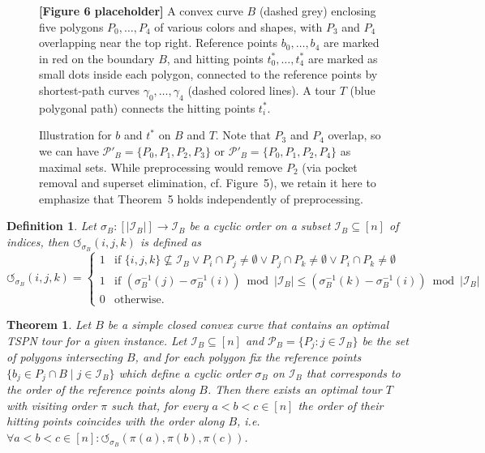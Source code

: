 \documentclass[11pt,a4paper]{article}
\theoremstyle{plain}
\newtheorem{theorem}{Theorem}
\newtheorem{definition}{Definition}
\begin{document}
\begin{figure}[h]
\centering
\begin{figplaceholder}
\textbf{[Figure 6 placeholder]} A convex curve $B$ (dashed grey) enclosing five polygons $P_0,\dots,P_4$ of various colors and shapes, with $P_3$ and $P_4$ overlapping near the top right. Reference points $b_0,\dots,b_4$ are marked in red on the boundary $B$, and hitting points $t_0^*,\dots,t_4^*$ are marked as small dots inside each polygon, connected to the reference points by shortest-path curves $\gamma_0,\dots,\gamma_4$ (dashed colored lines). A tour $T$ (blue polygonal path) connects the hitting points $t_i^*$.
\end{figplaceholder}
\caption{Illustration for $b$ and $t^*$ on $B$ and $T$. Note that $P_3$ and $P_4$ overlap, so we can have $\mathcal{P}'_B = \{P_0, P_1, P_2, P_3\}$ or $\mathcal{P}'_B = \{P_0, P_1, P_2, P_4\}$ as maximal sets. While preprocessing would remove $P_2$ (via pocket removal and superset elimination, cf. Figure~5), we retain it here to emphasize that Theorem~5 holds independently of preprocessing.}
\label{fig:6}
\end{figure}

\begin{definition}
Let $\sigma_B : [|\mathcal{I}_B|] \to \mathcal{I}_B$ be a cyclic order on a subset $\mathcal{I}_B \subseteq [n]$ of indices, then $\circlearrowleft_{\sigma_B}(i,j,k)$ is defined as
\[
\circlearrowleft_{\sigma_B}(i,j,k) =
\begin{cases}
1 & \text{if } \{i,j,k\} \not\subseteq \mathcal{I}_B \lor P_i \cap P_j \neq \emptyset \lor P_j \cap P_k \neq \emptyset \lor P_i \cap P_k \neq \emptyset \\
1 & \text{if } (\sigma_B^{-1}(j) - \sigma_B^{-1}(i)) \bmod |\mathcal{I}_B| \leq (\sigma_B^{-1}(k) - \sigma_B^{-1}(i)) \bmod |\mathcal{I}_B| \\
0 & \text{otherwise.}
\end{cases}
\]
\end{definition}

\begin{theorem}
Let $B$ be a simple closed convex curve that contains an optimal TSPN tour for a given instance. Let $\mathcal{I}_B \subseteq [n]$ and $\mathcal{P}_B = \{P_j : j \in \mathcal{I}_B\}$ be the set of polygons intersecting $B$, and for each polygon fix the reference points $\{b_j \in P_j \cap B \mid j \in \mathcal{I}_B\}$ which define a cyclic order $\sigma_B$ on $\mathcal{I}_B$ that corresponds to the order of the reference points along $B$. Then there exists an optimal tour $T$ with visiting order $\pi$ such that, for every $a < b < c \in [n]$ the order of their hitting points coincides with the order along $B$, i.e. $\forall a < b < c \in [n] : \circlearrowleft_{\sigma_B}(\pi(a), \pi(b), \pi(c))$.
\end{theorem}
\end{document}
